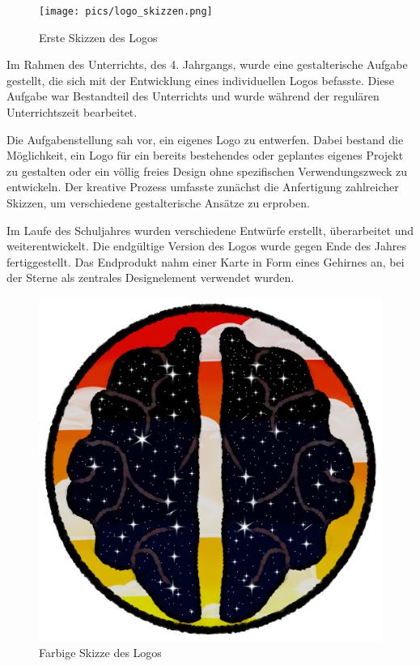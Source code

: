 \begin{figure}
    \centering
    \texttt{[image: pics/logo\_skizzen.png]}
    \caption{Erste Skizzen des Logos}
    \label{fig:logo-skizzen}
\end{figure}

Im Rahmen des Unterrichts, des 4. Jahrgangs, wurde eine gestalterische Aufgabe 
gestellt, die sich mit der Entwicklung eines individuellen Logos befasste. Diese 
Aufgabe war Bestandteil des Unterrichts und wurde während der regulären Unterrichtszeit 
bearbeitet. 

Die Aufgabenstellung sah vor, ein eigenes Logo zu entwerfen. Dabei bestand die 
Möglichkeit, ein Logo für ein bereits bestehendes oder geplantes eigenes Projekt 
zu gestalten oder ein völlig freies Design ohne spezifischen Verwendungszweck zu 
entwickeln. Der kreative Prozess umfasste zunächst die Anfertigung zahlreicher 
Skizzen, um verschiedene gestalterische Ansätze zu erproben.

Im Laufe des Schuljahres wurden verschiedene Entwürfe erstellt, überarbeitet und 
weiterentwickelt. Die endgültige Version des Logos wurde gegen Ende des Jahres 
fertiggestellt. Das Endprodukt nahm einer Karte in Form eines Gehirnes an, bei der 
Sterne als zentrales Designelement verwendet wurden.

\begin{figure}[h t]
    \centering
    \includegraphics[scale=0.05]{pics/Farbige Skizze.png}
    \caption{Farbige Skizze des Logos}
    \label{fig:logo-farbige-skizze}
\end{figure}

